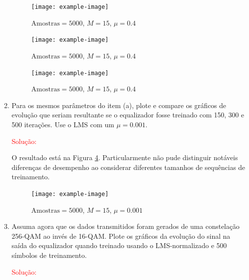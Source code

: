\begin{enumerate}
        \begin{figure}[!htp]
            \centering
            \texttt{[image: example-image]}
            \caption{$\text{Amostras} = 5000$, $M = 15$, $\mu = 0.4$}
            \label{fig:L3Q6A1}
        \end{figure}
        
        \begin{figure}[!htp]
            \centering
            \texttt{[image: example-image]}
            \caption{$\text{Amostras} = 5000$, $M = 15$, $\mu = 0.4$}
            \label{fig:L3Q6A2}
        \end{figure}
        
        \begin{figure}[!htp]
            \centering
            \texttt{[image: example-image]}
            \caption{$\text{Amostras} = 5000$, $M = 15$, $\mu = 0.4$}
            \label{fig:L3Q6A3}
        \end{figure}
        
        \clearpage

    \item Para os mesmos parâmetros do item (a), plote e compare os gráﬁcos de evolução que seriam resultante se o equalizador fosse treinado com 150, 300 e 500 iterações. Use o LMS com um
    $\mu = 0.001$.
    
        \textcolor{red}{Solução:}

        O resultado está na Figura \ref{fig:L3Q6B}. Particularmente não pude distinguir notáveis diferenças de desempenho ao considerar diferentes tamanhos de sequências de treinamento.

            
    \begin{figure}[!htp]
        \centering
        \texttt{[image: example-image]}
        \caption{$\text{Amostras} = 5000$, $M = 15$, $\mu = 0.001$}
        \label{fig:L3Q6B}
    \end{figure}

    \item Assuma agora que os dados transmitidos foram gerados de uma constelação 256-QAM ao invés de 16-QAM. Plote os gráﬁcos da evolução do sinal na saída do equalizador quando treinado
    usando o LMS-normalizado e 500 símbolos de treinamento.					
    
        \textcolor{red}{Solução:}


\end{enumerate}
